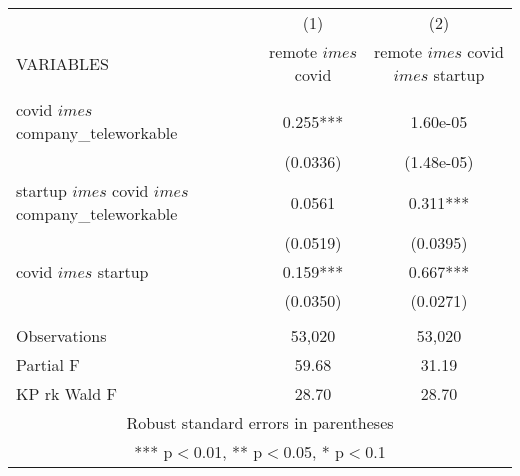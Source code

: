 \begin{tabular}{lcc} \hline
 & (1) & (2) \\
VARIABLES & remote $	imes$ covid & remote $	imes$ covid $	imes$ startup \\ \hline
 &  &  \\
covid $	imes$ company\_teleworkable & 0.255*** & 1.60e-05 \\
 & (0.0336) & (1.48e-05) \\
startup $	imes$ covid $	imes$ company\_teleworkable & 0.0561 & 0.311*** \\
 & (0.0519) & (0.0395) \\
covid $	imes$ startup & 0.159*** & 0.667*** \\
 & (0.0350) & (0.0271) \\
 &  &  \\
Observations & 53,020 & 53,020 \\
Partial F & 59.68 & 31.19 \\
 KP rk Wald F & 28.70 & 28.70 \\ \hline
\multicolumn{3}{c}{ Robust standard errors in parentheses} \\
\multicolumn{3}{c}{ *** p$<$0.01, ** p$<$0.05, * p$<$0.1} \\
\end{tabular}
